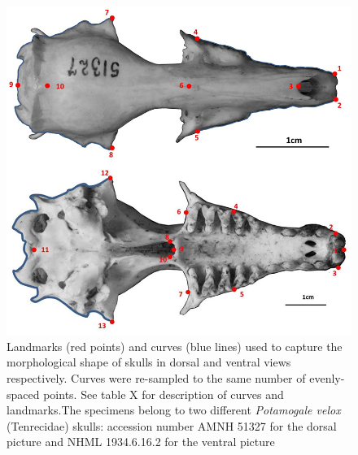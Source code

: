 \documentclass[12pt,a4paper]{article}
\begin{document}
	\begin{figure}
	\centering
	\includegraphics[width=1\linewidth]{figures/SkDors+Skvent_landmark_diagrams.png}
	
	\caption{Landmarks (red points) and curves (blue lines) used to capture the morphological shape of skulls in dorsal and ventral views respectively. Curves were re-sampled to the same number of evenly-spaced points. See table X for description of curves and landmarks.The specimens belong to two different \textit{Potamogale velox} (Tenrecidae) skulls: accession number AMNH 51327 for the dorsal picture and NHML 1934.6.16.2 for the ventral picture}
	
	\label{fig:skdors_skvent_landmarks}
	\end{figure}
\end{document}

